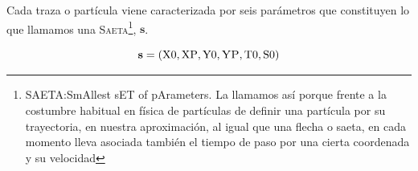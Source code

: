 \documentclass[a4paper]{article}
\let\vec\mathbf  %
\begin{document}
% 
% 
% 
% 
% 

Cada traza o partícula viene caracterizada por seis parámetros que constituyen lo que llamamos una \textsc{Saeta}\footnote{SAETA:SmAllest sET of pArameters. La llamamos así porque frente a la costumbre habitual en física  de partículas de definir una partícula por su trayectoria, en nuestra aproximación, al igual que una flecha o saeta, en cada momento lleva asociada también el tiempo de paso por una cierta coordenada y su velocidad}, $\vec{s}$. 

\begin{equation}
    \vec{s} = (\textrm{X0}, \textrm{XP}, \textrm{Y0}, \textsc{YP}, \textrm{T0}, \textrm{S0})
    \label{eq:saeta}
\end{equation}
\end{document}
